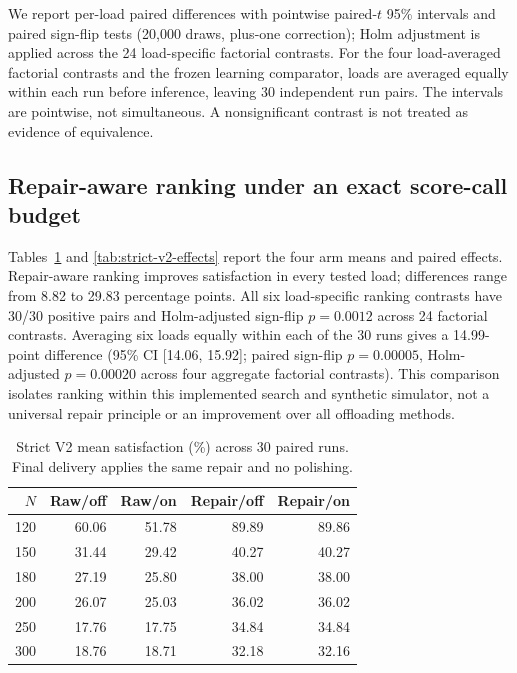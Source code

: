 \documentclass[pdflatex,sn-mathphys-num]{sn-jnl}
\begin{document}
We report per-load paired differences with pointwise paired-$t$ 95\% intervals and paired sign-flip tests (20,000 draws, plus-one correction); Holm adjustment is applied across the 24 load-specific factorial contrasts. For the four load-averaged factorial contrasts and the frozen learning comparator, loads are averaged equally within each run before inference, leaving 30 independent run pairs. The intervals are pointwise, not simultaneous. A nonsignificant contrast is not treated as evidence of equivalence.

\subsection{Repair-aware ranking under an exact score-call budget}
Tables~\ref{tab:strict-v2-results} and \ref{tab:strict-v2-effects} report the four arm means and paired effects. Repair-aware ranking improves satisfaction in every tested load; differences range from 8.82 to 29.83 percentage points. All six load-specific ranking contrasts have 30/30 positive pairs and Holm-adjusted sign-flip $p=0.0012$ across 24 factorial contrasts. Averaging six loads equally within each of the 30 runs gives a 14.99-point difference (95\% CI [14.06, 15.92]; paired sign-flip $p=0.00005$, Holm-adjusted $p=0.00020$ across four aggregate factorial contrasts). This comparison isolates ranking within this implemented search and synthetic simulator, not a universal repair principle or an improvement over all offloading methods.

\begin{table}[t]
\caption{Strict V2 mean satisfaction (\%) across 30 paired runs. Final delivery applies the same repair and no polishing.}
\label{tab:strict-v2-results}
\centering\small
\setlength{\tabcolsep}{5pt}
\begin{tabular}{r r r r r}
\toprule
$N$ & Raw/off & Raw/on & Repair/off & Repair/on \\
\midrule
120 & 60.06 & 51.78 & 89.89 & 89.86 \\
150 & 31.44 & 29.42 & 40.27 & 40.27 \\
180 & 27.19 & 25.80 & 38.00 & 38.00 \\
200 & 26.07 & 25.03 & 36.02 & 36.02 \\
250 & 17.76 & 17.75 & 34.84 & 34.84 \\
300 & 18.76 & 18.71 & 32.18 & 32.16 \\
\bottomrule
\end{tabular}
\end{table}
\end{document}
